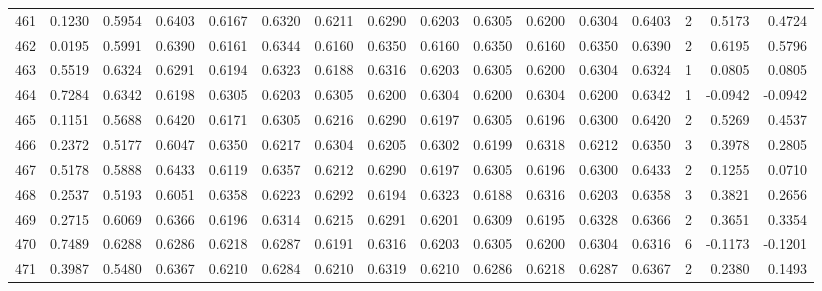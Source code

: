 \begin{tabular}{lrrrrrrrrrrrrrrr}
461 &      0.1230 &  0.5954 &  0.6403 &  0.6167 &  0.6320 &  0.6211 &  0.6290 &  0.6203 &  0.6305 &  0.6200 &   0.6304 &     0.6403 &      2 &                    0.5173 &                     0.4724 \\
462 &      0.0195 &  0.5991 &  0.6390 &  0.6161 &  0.6344 &  0.6160 &  0.6350 &  0.6160 &  0.6350 &  0.6160 &   0.6350 &     0.6390 &      2 &                    0.6195 &                     0.5796 \\
463 &      0.5519 &  0.6324 &  0.6291 &  0.6194 &  0.6323 &  0.6188 &  0.6316 &  0.6203 &  0.6305 &  0.6200 &   0.6304 &     0.6324 &      1 &                    0.0805 &                     0.0805 \\
464 &      0.7284 &  0.6342 &  0.6198 &  0.6305 &  0.6203 &  0.6305 &  0.6200 &  0.6304 &  0.6200 &  0.6304 &   0.6200 &     0.6342 &      1 &                   -0.0942 &                    -0.0942 \\
465 &      0.1151 &  0.5688 &  0.6420 &  0.6171 &  0.6305 &  0.6216 &  0.6290 &  0.6197 &  0.6305 &  0.6196 &   0.6300 &     0.6420 &      2 &                    0.5269 &                     0.4537 \\
466 &      0.2372 &  0.5177 &  0.6047 &  0.6350 &  0.6217 &  0.6304 &  0.6205 &  0.6302 &  0.6199 &  0.6318 &   0.6212 &     0.6350 &      3 &                    0.3978 &                     0.2805 \\
467 &      0.5178 &  0.5888 &  0.6433 &  0.6119 &  0.6357 &  0.6212 &  0.6290 &  0.6197 &  0.6305 &  0.6196 &   0.6300 &     0.6433 &      2 &                    0.1255 &                     0.0710 \\
468 &      0.2537 &  0.5193 &  0.6051 &  0.6358 &  0.6223 &  0.6292 &  0.6194 &  0.6323 &  0.6188 &  0.6316 &   0.6203 &     0.6358 &      3 &                    0.3821 &                     0.2656 \\
469 &      0.2715 &  0.6069 &  0.6366 &  0.6196 &  0.6314 &  0.6215 &  0.6291 &  0.6201 &  0.6309 &  0.6195 &   0.6328 &     0.6366 &      2 &                    0.3651 &                     0.3354 \\
470 &      0.7489 &  0.6288 &  0.6286 &  0.6218 &  0.6287 &  0.6191 &  0.6316 &  0.6203 &  0.6305 &  0.6200 &   0.6304 &     0.6316 &      6 &                   -0.1173 &                    -0.1201 \\
471 &      0.3987 &  0.5480 &  0.6367 &  0.6210 &  0.6284 &  0.6210 &  0.6319 &  0.6210 &  0.6286 &  0.6218 &   0.6287 &     0.6367 &      2 &                    0.2380 &                     0.1493 \\

\end{tabular}
